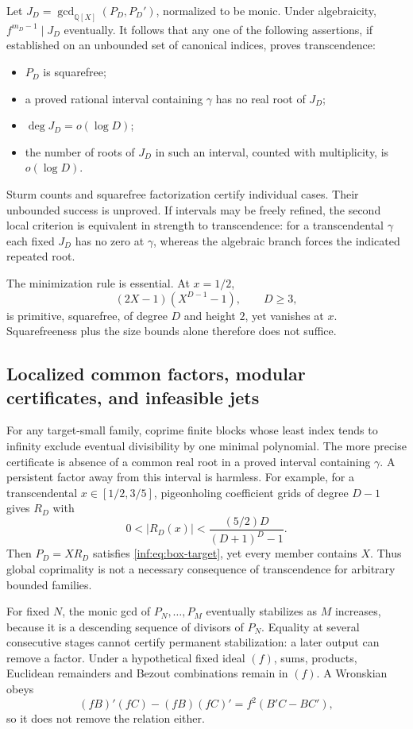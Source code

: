 \documentclass[11pt,a4paper]{article}
\newcommand{\Q}{\mathbb Q}
\theoremstyle{definition}
\theoremstyle{remark}
\numberwithin{equation}{section}
\begin{document}
Let $J_D=\gcd_{\Q[X]}(P_D,P_D')$, normalized to be monic. Under algebraicity, $f^{m_D-1}\mid J_D$ eventually. It follows that any one of the following assertions, if established on an unbounded set of canonical indices, proves transcendence:
\begin{itemize}
 \item $P_D$ is squarefree;
 \item a proved rational interval containing $\gamma$ has no real root of $J_D$;
 \item $\deg J_D=o(\log D)$;
 \item the number of roots of $J_D$ in such an interval, counted with multiplicity, is $o(\log D)$.
\end{itemize}
Sturm counts and squarefree factorization certify individual cases. Their unbounded success is unproved. If intervals may be freely refined, the second local criterion is equivalent in strength to transcendence: for a transcendental $\gamma$ each fixed $J_D$ has no zero at $\gamma$, whereas the algebraic branch forces the indicated repeated root.

The minimization rule is essential. At $x=1/2$,
\[
 (2X-1)(X^{D-1}-1),\qquad D\ge3,
\]
is primitive, squarefree, of degree $D$ and height $2$, yet vanishes at $x$. Squarefreeness plus the size bounds alone therefore does not suffice.

\subsection{Localized common factors, modular certificates, and infeasible jets}
\label{inf:sub:escapes}
For any target-small family, coprime finite blocks whose least index tends to infinity exclude eventual divisibility by one minimal polynomial. The more precise certificate is absence of a common real root in a proved interval containing $\gamma$. A persistent factor away from this interval is harmless. For example, for a transcendental $x\in[1/2,3/5]$, pigeonholing coefficient grids of degree $D-1$ gives $R_D$ with
\[
 0<|R_D(x)|<\frac{(5/2)D}{(D+1)^D-1}.
\]
Then $P_D=XR_D$ satisfies \eqref{inf:eq:box-target}, yet every member contains $X$. Thus global coprimality is not a necessary consequence of transcendence for arbitrary bounded families.

For fixed $N$, the monic gcd of $P_N,\ldots,P_M$ eventually stabilizes as $M$ increases, because it is a descending sequence of divisors of $P_N$. Equality at several consecutive stages cannot certify permanent stabilization: a later output can remove a factor. Under a hypothetical fixed ideal $(f)$, sums, products, Euclidean remainders and Bezout combinations remain in $(f)$. A Wronskian obeys
\[
 (fB)'(fC)-(fB)(fC)'=f^2(B'C-BC'),
\]
so it does not remove the relation either.
\end{document}
